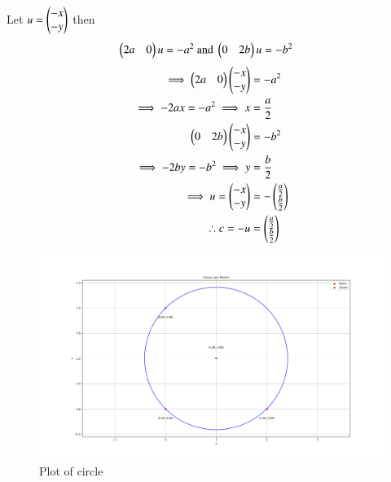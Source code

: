 \documentclass[journal]{IEEEtran}
\begin{document}
Let $u=\begin{pmatrix}-x\\-y\end{pmatrix}$ then
\begin{align}
    \begin{pmatrix}2a&0\end{pmatrix}u=-a^2\text{ and }\begin{pmatrix}0&2b\end{pmatrix}u&=-b^2
\end{align}
\begin{align}
    \implies\begin{pmatrix}2a&0\end{pmatrix}\begin{pmatrix}-x\\-y\end{pmatrix}&=-a^2\\
    \implies-2ax=-a^2\implies x&=\frac{a}{2}\\
    \begin{pmatrix}0&2b\end{pmatrix}\begin{pmatrix}-x\\-y\end{pmatrix}&=-b^2\\
    \implies-2by=-b^2\implies y&=\frac{b}{2}\\
    \implies u=\begin{pmatrix}-x\\-y\end{pmatrix}&=-\begin{pmatrix}\frac{a}{2}\\ \frac{b}{2}\end{pmatrix}\\
    \therefore c=-u&=\begin{pmatrix}\frac{a}{2}\\ \frac{b}{2}\end{pmatrix}
\end{align}
\begin{figure}[h!]
   \centering
   \includegraphics[width=0.7\linewidth]{figs/Figure_1.png}
   \caption{Plot of circle  }
   \label{stemplot}
\end{figure}
\end{document}
